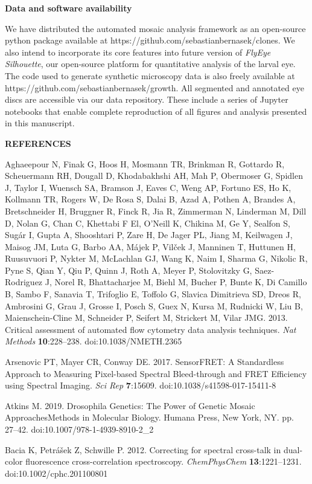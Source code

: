 \textbf{Data and software availability}

We have distributed the automated mosaic analysis framework as an open-source python package available at https://github.com/sebastianbernasek/clones. We also intend to incorporate its core features into future version of \emph{FlyEye Silhouette}, our open-source platform for quantitative analysis of the larval eye. The code used to generate synthetic microscopy data is also freely available at https://github.com/sebastianbernasek/growth. All segmented and annotated eye discs are accessible via our data repository. These include a series of Jupyter notebooks that enable complete reproduction of all figures and analysis presented in this manuscript.

\textbf{REFERENCES}

Aghaeepour N, Finak G, Hoos H, Mosmann TR, Brinkman R, Gottardo R, Scheuermann RH, Dougall D, Khodabakhshi AH, Mah P, Obermoser G, Spidlen J, Taylor I, Wuensch SA, Bramson J, Eaves C, Weng AP, Fortuno ES, Ho K, Kollmann TR, Rogers W, De Rosa S, Dalai B, Azad A, Pothen A, Brandes A, Bretschneider H, Bruggner R, Finck R, Jia R, Zimmerman N, Linderman M, Dill D, Nolan G, Chan C, Khettabi F El, O'Neill K, Chikina M, Ge Y, Sealfon S, Sugár I, Gupta A, Shooshtari P, Zare H, De Jager PL, Jiang M, Keilwagen J, Maisog JM, Luta G, Barbo AA, Májek P, Vilček J, Manninen T, Huttunen H, Ruusuvuori P, Nykter M, McLachlan GJ, Wang K, Naim I, Sharma G, Nikolic R, Pyne S, Qian Y, Qiu P, Quinn J, Roth A, Meyer P, Stolovitzky G, Saez-Rodriguez J, Norel R, Bhattacharjee M, Biehl M, Bucher P, Bunte K, Di Camillo B, Sambo F, Sanavia T, Trifoglio E, Toffolo G, Slavica Dimitrieva SD, Dreos R, Ambrosini G, Grau J, Grosse I, Posch S, Guex N, Kursa M, Rudnicki W, Liu B, Maienschein-Cline M, Schneider P, Seifert M, Strickert M, Vilar JMG. 2013. Critical assessment of automated flow cytometry data analysis techniques. \emph{Nat Methods} \textbf{10}:228--238. doi:10.1038/NMETH.2365

Arsenovic PT, Mayer CR, Conway DE. 2017. SensorFRET: A Standardless Approach to Measuring Pixel-based Spectral Bleed-through and FRET Efficiency using Spectral Imaging. \emph{Sci Rep} \textbf{7}:15609. doi:10.1038/s41598-017-15411-8

Atkins M. 2019. Drosophila Genetics: The Power of Genetic Mosaic ApproachesMethods in Molecular Biology. Humana Press, New York, NY. pp. 27--42. doi:10.1007/978-1-4939-8910-2\_2

Bacia K, Petrášek Z, Schwille P. 2012. Correcting for spectral cross-talk in dual-color fluorescence cross-correlation spectroscopy. \emph{ChemPhysChem} \textbf{13}:1221--1231. doi:10.1002/cphc.201100801

